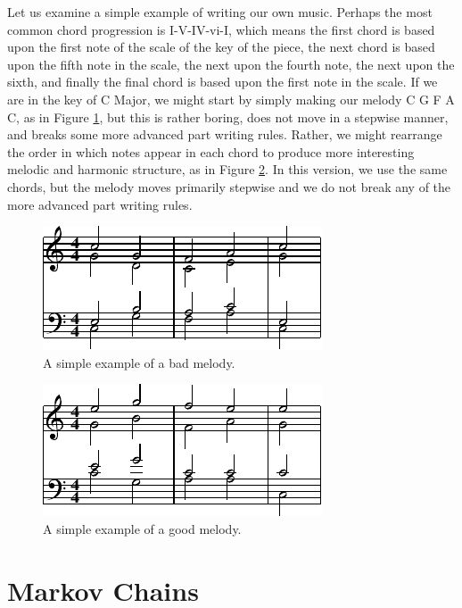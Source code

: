 Let us examine a simple example of writing our own music.
Perhaps the most common chord progression is I-V-IV-vi-I, which means the first chord is based upon the first note of the scale of the key of the piece, the next chord is based upon the fifth note in the scale, the next upon the fourth note, the next upon the sixth, and finally the final chord is based upon the first note in the scale.
If we are in the key of C Major, we might start by simply making our melody C G F A C, as in Figure \ref{fig:basic_melody}, but this is rather boring, does not move in a stepwise manner, and breaks some more advanced part writing rules.
Rather, we might rearrange the order in which notes appear in each chord to produce more interesting melodic and harmonic structure, as in Figure \ref{fig:better_melody}.
In this version, we use the same chords, but the melody moves primarily stepwise and we do not break any of the more advanced part writing rules.

\begin{figure}[h]
	\centering
	\includegraphics{figures/boring_melody.pdf}
	\caption{A simple example of a bad melody.}
	\label{fig:basic_melody}
\end{figure}

\begin{figure}[h]
	\centering
	\includegraphics{figures/better_melody.pdf}
	\caption{A simple example of a good melody.}
	\label{fig:better_melody}
\end{figure}

\section[Markov Chains]{Markov Chains} \label{bg:markov}

